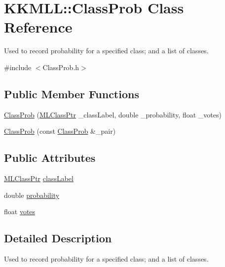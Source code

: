 \hypertarget{class_k_k_m_l_l_1_1_class_prob}{}\section{K\+K\+M\+LL\+:\+:Class\+Prob Class Reference}
\label{class_k_k_m_l_l_1_1_class_prob}


Used to record probability for a specified class; and a list of classes.  




{\ttfamily \#include $<$Class\+Prob.\+h$>$}

\subsection*{Public Member Functions}
\begin{DoxyCompactItemize}
\item 
\hyperlink{class_k_k_m_l_l_1_1_class_prob_aae0367b7e2f4eb5790ffe4c575f5aa98}{Class\+Prob} (\hyperlink{namespace_k_k_m_l_l_ac272393853d59e72e8456f14cd6d8c23}{M\+L\+Class\+Ptr} \+\_\+class\+Label, double \+\_\+probability, float \+\_\+votes)
\item 
\hyperlink{class_k_k_m_l_l_1_1_class_prob_a12db56a41e1df442336fd7a84f412261}{Class\+Prob} (const \hyperlink{class_k_k_m_l_l_1_1_class_prob}{Class\+Prob} \&\+\_\+pair)
\end{DoxyCompactItemize}
\subsection*{Public Attributes}
\begin{DoxyCompactItemize}
\item 
\hyperlink{namespace_k_k_m_l_l_ac272393853d59e72e8456f14cd6d8c23}{M\+L\+Class\+Ptr} \hyperlink{class_k_k_m_l_l_1_1_class_prob_ac9d2a9c81bb36e0adc444b4409f9410d}{class\+Label}
\item 
double \hyperlink{class_k_k_m_l_l_1_1_class_prob_acea1b6e0e6011c4d7d1008a73c6bbc37}{probability}
\item 
float \hyperlink{class_k_k_m_l_l_1_1_class_prob_a0e0ab2ae02ec4390c60f87c1ab450da8}{votes}
\end{DoxyCompactItemize}


\subsection{Detailed Description}
Used to record probability for a specified class; and a list of classes. 

